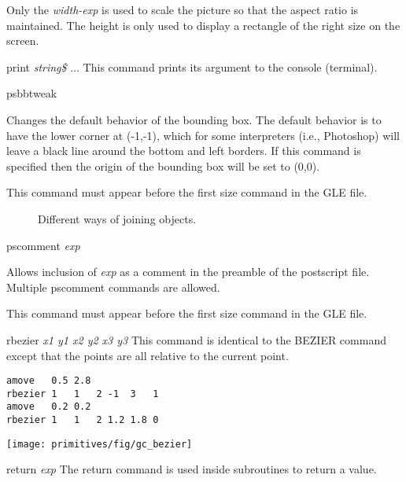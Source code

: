 \begin{commanddescription}
Only the {\it width-exp} is used to scale the picture so that the
aspect ratio is maintained. The
height is only used to display a rectangle of the right size on the screen.

\item[{\sf print {\it string\$} $\ldots$}]
 This command prints its argument to the console (terminal).

\item[{\sf psbbtweak}]

Changes the default behavior of the bounding box.  The default behavior is to have the lower corner at (-1,-1), which for some interpreters (i.e., Photoshop) will leave a black line around the bottom and left borders.  If this command is specified then the origin of the bounding box will be set to (0,0).

This command must appear before the first {\sf size} command in the GLE file.

\begin{figure}
\centering
\mbox{}
\caption{\label{joicur:fig}Different ways of joining objects.}
\end{figure}

\item[{\sf pscomment} {\it exp}]

Allows inclusion of {\it exp} as a comment in the preamble of the postscript file.  Multiple {\sf pscomment} commands are allowed.

This command must appear before the first {\sf size} command in the GLE file.

\item[{\sf rbezier {\it x1 y1 x2 y2 x3 y3}}]
 
This command is identical to the BEZIER command except that the points are
all relative to the current point.

\begin{minipage}[c]{8cm}
\begin{Verbatim}
amove   0.5 2.8 
rbezier 1   1   2 -1  3   1
amove   0.2 0.2 
rbezier 1   1   2 1.2 1.8 0
\end{Verbatim}
\end{minipage}
\hfill
\begin{minipage}[c]{7cm}
\mbox{\texttt{[image: primitives/fig/gc\_bezier]}}
\end{minipage}

\item[{\sf return} {\it exp}]
The {\sf return} command is used inside subroutines to return a value.


\end{commanddescription}
